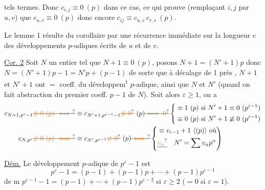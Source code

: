 tels termes. Donc $c_{i,j}\equiv0\ (p)$ dans ce cas, ce qui prouve (remplaçant $i,j$ par $u,v$) que $c_{u,v}\equiv0\ (p)$ donc encore $c_{ij}\equiv c_{u,v}\,c_{r,s}\ (p)$.

Le lemme 1 résulte du corollaire par une récurrence immédiate sur la longueur $e$ des développements $p$-adiques écrits de $u$ et de $v$.

\uline{Cor. 2} Soit $N$ un entier  tel que $N+1\equiv0\ (p)$, posons $N+1=(N'+1)p$ donc $N=(N'+1)p-1=N'p+(p-1)$ \deleted{\unsure{$\in$|$($}} de sorte que à décalage de 1 près\unsure{\}} ,  $N+1$ et $N'+1$ ont $=$ coeff. du développem\textsuperscript{t} $p$-adique, ainsi que $N$ et $N'$ (quand on fait abstraction du premier coeff. $p-1$ de $N$). Soit alors $\varepsilon\geq1$, on a
\[
\begin{aligned}
c_{N+1,p^\varepsilon-1}\deleted{\unsure{\not\equiv0\ (p)\iff}}&\equiv c_{N'+1,p^{\varepsilon-1}-1}\deleted{\unsure{\not\equiv0}}\ (p)\deleted{\unsure{\iff0}}\left\{\begin{aligned}&\equiv1\ (p)\ \text{si }N'+1\equiv0\ (p^{\varepsilon-1})\\&\equiv0\ (p)\ \text{si }N'+1\not\equiv0\ (p^{\varepsilon-1})\end{aligned}\right.\\
c_{N,p^\varepsilon}\deleted{\unsure{\not\equiv0\ (p)\iff}}&\equiv c_{N',p^{\varepsilon-1}}\deleted{\unsure{\not\equiv0}}\ (p)\deleted{\unsure{\iff}}\left\{\begin{aligned}&\equiv v_{\varepsilon-1}+1\ \inserted{(p)}\ \text{où}\\&\deleted{\unsure{v_\alpha}}\quad N'=\sum v_\alpha p^\alpha\end{aligned}\right)
\end{aligned}
\]

\uline{Dém.} Le développement $p$-adique de $p^\varepsilon-1$ est
\[
p^\varepsilon-1=(p-1)+(p-1)p+\cdots+(p-1)p^{\varepsilon-1}
\]
de m $p^{\varepsilon-1}-1=(p-1)+\cdots+(p-1)p^{\varepsilon-2}$ si $\varepsilon\geq2$ ($=0$ si $\varepsilon=1$).

